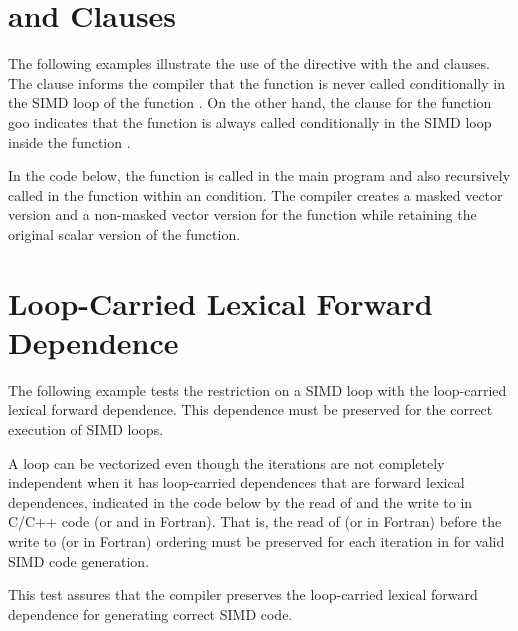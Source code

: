 \section{ and  Clauses}
\label{sec:SIMD_branch}

The following examples illustrate the use of the  
directive with the  and  clauses. The 
 clause informs the compiler that the function  is 
never called conditionally in the SIMD loop of the function . On 
the other hand, the  clause for the function goo indicates that 
the function is always called conditionally in the SIMD loop inside 
the function .




In the code below, the function  is called in the main program and 
also recursively called in the function  within an  
condition. The compiler creates a masked vector version and a non-masked vector 
version for the function  while retaining the original scalar 
version of the  function.





\section{Loop-Carried Lexical Forward Dependence}
\label{sec:SIMD_forward_dep}


 The following example tests the restriction on a SIMD loop with the loop-carried lexical forward dependence. This dependence must be preserved for the correct execution of SIMD loops.

A loop can be vectorized even though the iterations are not completely independent when it has loop-carried dependences that are forward lexical dependences, indicated in the code below by the read of  and the write to  in C/C++ code (or  and  in Fortran). That is, the read of  (or  in Fortran) before the write to  (or  in Fortran) ordering must be preserved for each iteration in  for valid SIMD code generation.

This test assures that the compiler preserves the loop-carried lexical forward dependence for generating correct SIMD code.



